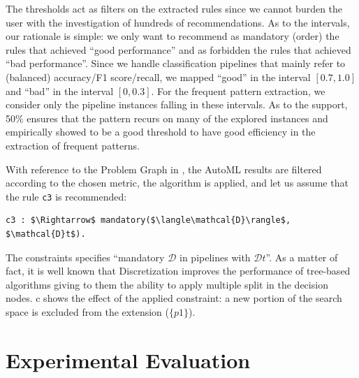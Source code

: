 The thresholds act as filters on the extracted rules since we cannot burden the user with the investigation of hundreds of recommendations. 
As to the intervals, our rationale is simple: we only want to recommend as mandatory (order) the rules that achieved ``good performance'' and as forbidden the rules that achieved ``bad performance''.
Since we handle classification pipelines that mainly refer to (balanced) accuracy/F1 score/recall, we mapped ``good'' in the interval $[0.7, 1.0]$ and ``bad'' in the interval $[0, 0.3]$. For the frequent pattern extraction, we consider only the pipeline instances falling in these intervals.
As to the support, 50\% ensures that the pattern recurs on many of the explored instances and empirically showed to be a good threshold to have good efficiency in the extraction of frequent patterns.

\begin{example}
With reference to the Problem Graph in ,
the AutoML results are filtered according to the chosen metric, the algorithm \cite{raschkas_2018_mlxtend} is applied, and let us assume that the rule \texttt{c3} is recommended:
\begin{lstlisting}[mathescape=true]
c3 : $\Rightarrow$ mandatory($\langle\mathcal{D}\rangle$, $\mathcal{D}t$).
\end{lstlisting}
The constraints specifies ``mandatory $\mathcal{D}$ in pipelines with $\mathcal{D}t$''.
As a matter of fact, it is well known that Discretization improves the performance of tree-based algorithms giving to them the ability to apply multiple split in the decision nodes.
c shows the effect of the applied constraint: a new portion of the search space is excluded from the extension ($\{p1\}$).
\end{example}


\section{Experimental Evaluation}\label{hamlet-sec:test}

